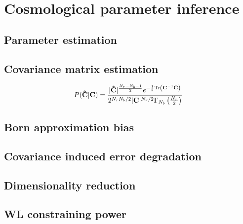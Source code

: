 
\chapter{Cosmological parameter inference}
\lhead[\fancyplain{}{\thepage}]{\fancyplain{}{\rightmark}}
 \thispagestyle{plain}
\setlength{\parindent}{10mm}


\section{Parameter estimation}

\section{Covariance matrix estimation}

\begin{equation}
\label{eq:5:wishart-pdf}
P(\mathbf{\hat{C}}\vert \mathbf{C}) = \frac{\vert\mathbf{\hat{C}}\vert^{\frac{N_r-N_b-1}{2}}e^{-\frac{1}{2}{\rm Tr}\left(\mathbf{C}^{-1}\mathbf{\hat{C}}\right)}}{2^{N_rN_b/2}\vert \mathbf{C}\vert^{N_r/2}\Gamma_{N_b}\left(\frac{N_r}{2}\right)}
\end{equation}

\section{Born approximation bias}

\section{Covariance induced error degradation}

\section{Dimensionality reduction}

\section{WL constraining power}

%